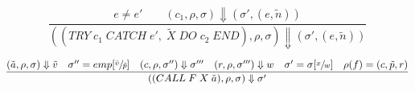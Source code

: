 \begin{equation}
\frac{e \neq e' \qquad (c_1, \rho, \sigma) \Downarrow (\sigma', (e, \tilde{n}))}{((TRY\; c_1\; CATCH\; e',\; \tilde{X}\; DO\; c_2\; END), \rho, \sigma) \Downarrow (\sigma', (e, \tilde{n}))}
\end{equation}

\begin{equation}
\frac
{(\tilde{a},\rho,\sigma) \Downarrow \tilde{v} \quad \sigma''= emp[\sfrac{\tilde{v}}{\tilde{p}}] \quad (c, \rho, \sigma'') \Downarrow \sigma''' \quad (r,\rho,\sigma''') \Downarrow w \quad \sigma' = \sigma[\sfrac{x}{w}] \quad \rho(f) = (c, \tilde{p}, r)}
{((CALL\; F \; X  \; \tilde{a}), \rho, \sigma) \Downarrow \sigma'}
\end{equation}